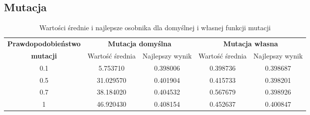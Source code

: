 \subsection{Mutacja}

\begin{table}[!h]
	\centering
	\caption{Wartości średnie i najlepsze osobnika dla domyślnej i własnej funkcji mutacji}
	\label{wyniki_klasyf}
	\begin{tabular}{|c|c|c|c|c|}
		\hline
		\textbf{Prawdopodobieństwo} & \multicolumn{2}{c}{\textbf{Mutacja domyślna}}  & \multicolumn{2}{|c|}{\textbf{Mutacja własna}} \\ \cline{2-5}
		\textbf{mutacji} & Wartość średnia & Najlepszy wynik & Wartość średnia & Najlepszy wynik \\ \hline
		
		0.1 & 5.753710  & 0.398006 & 0.398736 & 0.398687 \\
		0.5 & 31.029570 & 0.401904 & 0.415733 & 0.398201 \\
		0.7 & 38.184020 & 0.404532 & 0.567679 & 0.398926 \\
		1   & 46.920430 & 0.408154 & 0.452637 & 0.400847  \\ \hline      
	\end{tabular}
\end{table}
